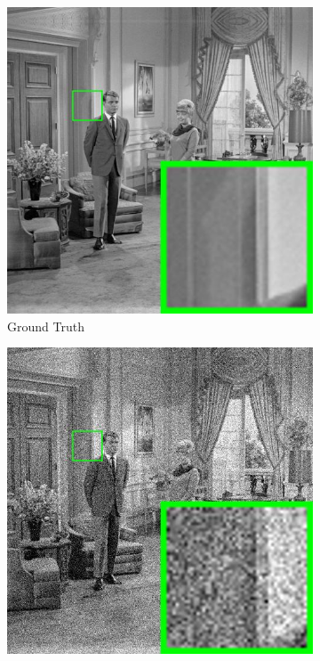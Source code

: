 \begin{figure}
    \centering
    \begin{subfigure}[t]{0.24\textwidth}
        \centering
        \includegraphics[width=1\textwidth]{images/pgpd/br_couple30.jpg}
	   \caption{Ground Truth}
    \end{subfigure}
    \hfill
    \begin{subfigure}[t]{0.24\textwidth}
        \centering
        \includegraphics[width=1\textwidth]{images/pgpd/br_30_couple.jpg}

\end{subfigure}
\end{figure}
